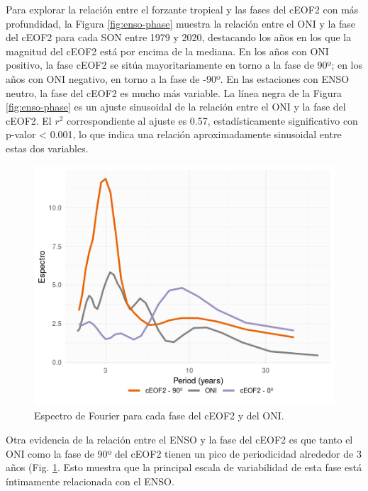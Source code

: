 \documentclass[12pt,oneside]{reedthesis}
\begin{document}
Para explorar la relación entre el forzante tropical y las fases del cEOF2 con más profundidad, la Figura \ref{fig:enso-phase} muestra la relación entre el ONI y la fase del cEOF2 para cada SON entre 1979 y 2020, destacando los años en los que la magnitud del cEOF2 está por encima de la mediana.
En los años con ONI positivo, la fase cEOF2 se sitúa mayoritariamente en torno a la fase de 90º; en los años con ONI negativo, en torno a la fase de -90º.
En las estaciones con ENSO neutro, la fase del cEOF2 es mucho más variable.
La línea negra de la Figura \ref{fig:enso-phase} es un ajuste sinusoidal de la relación entre el ONI y la fase del cEOF2.
El \(r^2\) correspondiente al ajuste es 0.57, estadísticamente significativo con p-valor \textless{} 0.001, lo que indica una relación aproximadamente sinusoidal entre estas dos variables.

\begin{figure}
\includegraphics{figures/20-ceofs/fft-ceof-era5-1} \caption{Espectro de Fourier para cada fase del cEOF2 y del ONI.}\label{fig:fft-ceof-era5}
\end{figure}



Otra evidencia de la relación entre el ENSO y la fase del cEOF2 es que tanto el ONI como la fase de 90º del cEOF2 tienen un pico de periodicidad alrededor de 3 años (Fig. \ref{fig:fft-ceof-era5}.
Esto muestra que la principal escala de variabilidad de esta fase está íntimamente relacionada con el ENSO.
\end{document}
